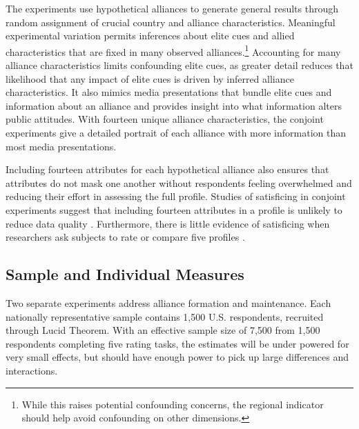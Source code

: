 \documentclass[12pt]{article}
\begin{document}
The experiments use hypothetical alliances to generate general results through random assignment of crucial country and alliance characteristics. 
Meaningful experimental variation permits inferences about elite cues and allied characteristics that are fixed in many observed alliances.\footnote{While this raises potential confounding concerns, the regional indicator should help avoid confounding on other dimensions.}
Accounting for many alliance characteristics limits confounding elite cues, as greater detail reduces that likelihood that any impact of elite cues is driven by inferred alliance characteristics.
It also mimics media presentations that bundle elite cues and information about an alliance and provides insight into what information alters public attitudes. 
With fourteen unique alliance characteristics, the conjoint experiments give a detailed portrait of each alliance with more information than most media presentations.


Including fourteen attributes for each hypothetical alliance also ensures that attributes do not mask one another without respondents feeling overwhelmed and reducing their effort in assessing the full profile.
Studies of satisficing in conjoint experiments suggest that including fourteen attributes in a profile is unlikely to reduce data quality \citep{Bansaketal2019}. 
Furthermore, there is little evidence of satisficing when researchers ask subjects to rate or compare five profiles \citep{Bansaketal2018}.



\subsection{Sample and Individual Measures}


Two separate experiments address alliance formation and maintenance. 
Each nationally representative sample contains 1,500 U.S. respondents, recruited through Lucid Theorem.
With an effective sample size of 7,500 from 1,500 respondents completing five rating tasks, the estimates will be under powered for very small effects, but should have enough power to pick up large differences and interactions. 
\end{document}
